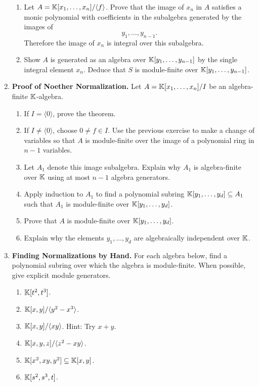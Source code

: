 \documentclass[12pt,reqno]{amsart}
\begin{document}
\begin{enumerate}[leftmargin=*, resume=problems]
\begin{enumerate}
    \item Let $A=\KK[x_1,\ldots,x_n]/\langle f\rangle$. Prove that the image of $x_n$ in $A$ satisfies a monic polynomial with coefficients in the subalgebra generated by the images of
    \[
    y_1,\ldots,y_{n-1}.
    \]
    Therefore the image of $x_n$ is integral over this subalgebra.

    \item Show $A$ is generated as an algebra over $\KK[y_1,\ldots,y_{n-1}]$ by the single integral element $x_{n}$. Deduce that $S$ is module-finite over $\KK[y_1,\ldots,y_{n-1}]$. 
\end{enumerate}

\item \textbf{Proof of Noether Normalization.} Let $A=\mathbb{K}[x_1,\ldots,x_n]/I$ be an algebra-finite $\mathbb{K}$-algebra.
\begin{enumerate}
    \item If $I=\langle 0\rangle$, prove the theorem.
    \item If $I\neq \langle 0\rangle$, choose $0\neq f\in I$. Use the previous exercise to make a change of variables so that $A$ is module-finite over the image of a polynomial ring in $n-1$ variables.
    \item Let $A_1$ denote this image subalgebra. Explain why $A_1$ is algebra-finite over $\mathbb{K}$ using at most $n-1$ algebra generators.
    \item Apply induction to $A_1$ to find a polynomial subring $\mathbb{K}[y_1,\ldots,y_d]\subseteq A_1$ such that $A_1$ is module-finite over $\mathbb{K}[y_1,\ldots,y_d]$.
    \item Prove that $A$ is module-finite over $\mathbb{K}[y_1,\ldots,y_d]$.
    \item Explain why the elements $y_1,\ldots,y_d$ are algebraically independent over $\mathbb{K}$.
\end{enumerate}

\item \textbf{Finding Normalizations by Hand.} For each algebra below, find a polynomial subring over which the algebra is module-finite. When possible, give explicit module generators.
\begin{multicols}{2}
\begin{enumerate}
    \item $\mathbb{K}[t^2,t^3]$.
    \item $\mathbb{K}[x,y]/\langle y^2-x^3\rangle$.
    \item $\mathbb{K}[x,y]/\langle xy\rangle$. Hint: Try $x+y$.
    \item $\mathbb{K}[x,y,z]/\langle z^2-xy\rangle$.
    \item $\mathbb{K}[x^2,xy,y^2]\subseteq \mathbb{K}[x,y]$.
    \item $\mathbb{K}[s^2,s^3,t]$.
\end{enumerate}
\end{multicols}


\end{enumerate}
\end{document}
